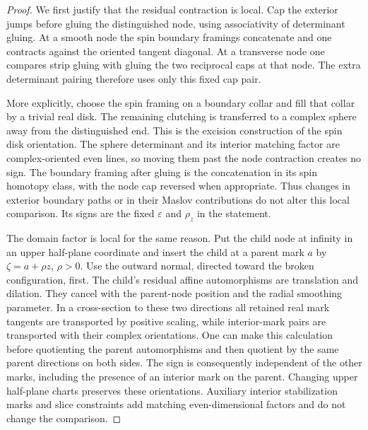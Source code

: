 \documentclass[11pt]{article}
\theoremstyle{definition}
\theoremstyle{remark}
\numberwithin{equation}{section}
\begin{document}
\begin{proof}
We first justify that the residual contraction is local.  Cap the
exterior jumps before gluing the distinguished node, using
associativity of determinant gluing.  At a smooth node the spin
boundary framings concatenate and one contracts against the oriented
tangent diagonal.  At a transverse node one compares strip gluing
with gluing the two reciprocal caps at that node.  The extra
determinant pairing therefore uses only this fixed cap pair.

More explicitly, choose the spin framing on a boundary collar and
fill that collar by a trivial real disk.  The remaining clutching is
transferred to a complex sphere away from the distinguished end.
This is the excision construction of the spin disk orientation.
The sphere determinant and its interior matching factor are
complex-oriented even lines, so moving them past the node
contraction creates no sign.  The boundary framing after gluing is
the concatenation in its spin homotopy class, with the node cap
reversed when appropriate.  Thus changes in exterior boundary
paths or in their Maslov contributions do not alter this local
comparison.  Its signs are the fixed $\varepsilon$ and $\rho_z$
in the statement.

The domain factor is local for the same reason.  Put the child node
at infinity in an upper half-plane coordinate and insert the child
at a parent mark $a$ by $\zeta=a+\rho z$, $\rho>0$.
Use the outward normal, directed toward the broken configuration,
first.  The child's residual affine automorphisms are translation
and dilation.  They cancel with the parent-node position and the
radial smoothing parameter.  In a cross-section to these two
directions all retained real mark tangents are transported by
positive scaling, while interior-mark pairs are transported with
their complex orientations.  One can make this calculation before
quotienting the parent automorphisms and then quotient by the same
parent directions on both sides.  The sign is consequently
independent of the other marks, including the presence of an
interior mark on the parent.  Changing upper half-plane charts
preserves these orientations.  Auxiliary interior stabilization
marks and slice constraints add matching even-dimensional factors
and do not change the comparison.


\end{proof}
\end{document}
